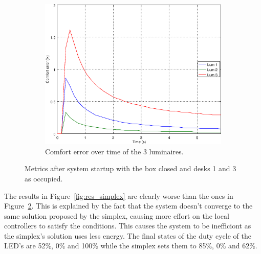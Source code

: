 \begin{figure}[ht]
\begin{subfigure}[t]{0.32\textwidth}
    \centering
    \includegraphics[width=.95\textwidth]{img/n_closed_o101}
    \caption{Comfort error over time of the 3 luminaires.}
    \label{fig:n_closed_o101}
    \end{subfigure}
    \caption{Metrics after system startup with the box closed and desks 1 and 3 as occupied. }
    \label{fig:closed_o101}
\end{figure}

The results in Figure~\ref{fig:res_simplex}  are clearly worse than the ones in Figure~\ref{fig:closed_o101}. This is explained by the fact that the system doesn't converge to the same solution proposed by the simplex, causing more effort on the local controllers to satisfy the conditions. This causes the system to be inefficiont as the simplex's solution uses less energy. The final states of the duty cycle of the LED's are 52\%, 0\% and 100\% while the simplex sets them to 85\%, 0\% and 62\%.

